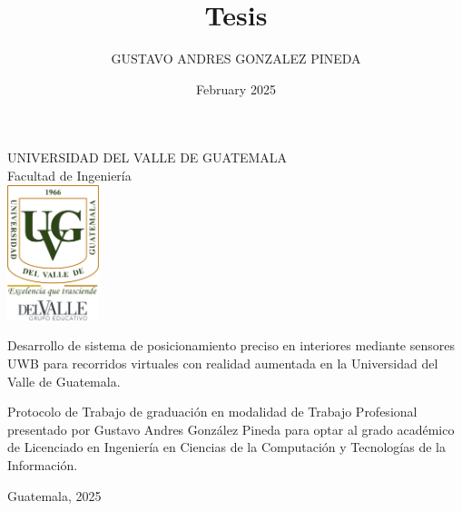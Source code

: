 \documentclass{article}
\title{Tesis}
\author{GUSTAVO ANDRES GONZALEZ PINEDA}
\date{February 2025}
\begin{document}
\begin{center}
\begin{doublespace}
    \thispagestyle{empty}  %
    \Large{UNIVERSIDAD DEL VALLE DE GUATEMALA}\\
    Facultad de Ingeniería \\    

    \vspace{15mm} 
    \includegraphics[width=0.2\textwidth]{images/Uvg_logo.jpg}

    \vspace{15mm} 
    {\Large Desarrollo de sistema de posicionamiento preciso en interiores mediante sensores UWB para recorridos virtuales con realidad aumentada en la Universidad del Valle de Guatemala.}

    \vspace{10mm} 
    {\Large Protocolo de Trabajo de graduación en modalidad de Trabajo Profesional presentado por Gustavo Andres González Pineda para optar al grado académico de Licenciado en Ingeniería en Ciencias de la Computación y Tecnologías de la Información.}

    {\Large Guatemala,  2025}
    
\end{doublespace}
\end{center}

\newpage %

\thispagestyle{empty} %
\mbox{} %
\newpage %
\end{document}

